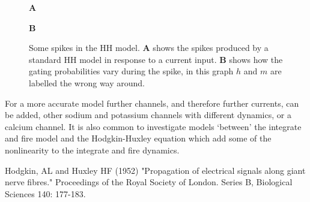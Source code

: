 \documentclass{article}
\begin{document}
\begin{figure}
\textbf{A}
\begin{center}

\end{center}
\textbf{B}
\begin{center}

\end{center}
\caption{Some spikes in the HH model. \textbf{A} shows the spikes produced by a standard HH model in response to a current input. \textbf{B} shows how the gating probabilities vary during the spike, in this graph $h$ and $m$ are labelled the wrong way around.\label{fig:HH_spike}}
\end{figure}

For a more accurate model further channels, and therefore further
currents, can be added, other sodium and potassium channels with
different dynamics, or a calcium channel. It is also common to
investigate models \lq{}between\rq{} the integrate and fire model and
the Hodgkin-Huxley equation which add some of the nonlinearity to the
integrate and fire dynamics.


\begin{thebibliography}{99}
Hodgkin, AL and Huxley HF (1952) 
\newblock"Propagation of electrical signals along giant nerve fibres." 
\newblock Proceedings of the Royal Society of London. Series B, Biological Sciences 140: 177-183.
\end{thebibliography}
\end{document}
